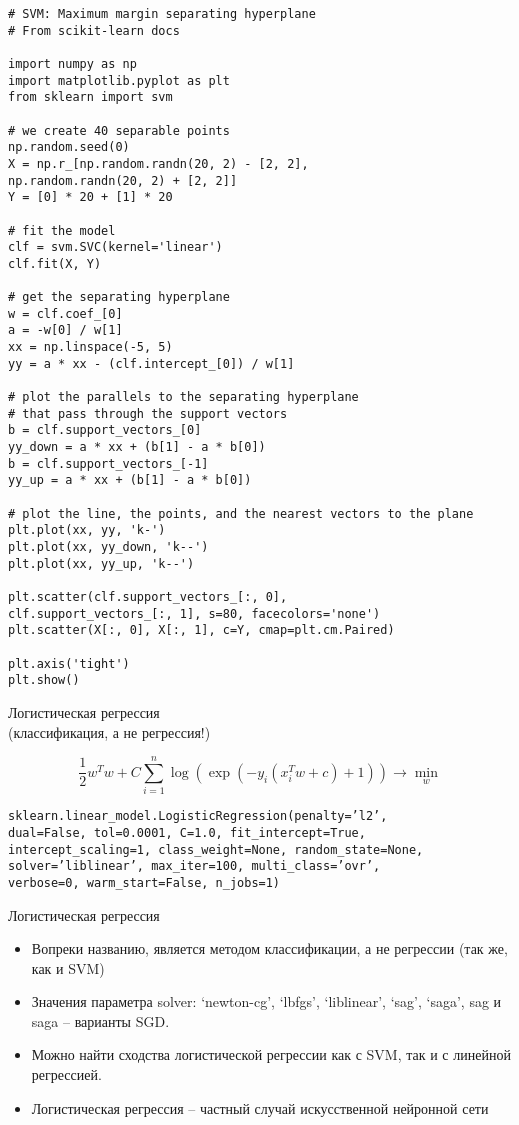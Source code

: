 \documentclass[landscape]{slides}
\begin{document}
\begin{slide}
\begin{verbatim}
# SVM: Maximum margin separating hyperplane
# From scikit-learn docs

import numpy as np
import matplotlib.pyplot as plt
from sklearn import svm

# we create 40 separable points
np.random.seed(0)
X = np.r_[np.random.randn(20, 2) - [2, 2],
np.random.randn(20, 2) + [2, 2]]
Y = [0] * 20 + [1] * 20

# fit the model
clf = svm.SVC(kernel='linear')
clf.fit(X, Y)

# get the separating hyperplane
w = clf.coef_[0]
a = -w[0] / w[1]
xx = np.linspace(-5, 5)
yy = a * xx - (clf.intercept_[0]) / w[1]

# plot the parallels to the separating hyperplane 
# that pass through the support vectors
b = clf.support_vectors_[0]
yy_down = a * xx + (b[1] - a * b[0])
b = clf.support_vectors_[-1]
yy_up = a * xx + (b[1] - a * b[0])

# plot the line, the points, and the nearest vectors to the plane
plt.plot(xx, yy, 'k-')
plt.plot(xx, yy_down, 'k--')
plt.plot(xx, yy_up, 'k--')

plt.scatter(clf.support_vectors_[:, 0],
clf.support_vectors_[:, 1], s=80, facecolors='none')
plt.scatter(X[:, 0], X[:, 1], c=Y, cmap=plt.cm.Paired)

plt.axis('tight')
plt.show()
\end{verbatim}
\end{slide}


\begin{slide}
Логистическая регрессия\\
(классификация, а не регрессия!)

$$ \frac 12 w^Tw + C \sum_{i=1}^n
\log\left(\exp\left(-y_i(x_i^Tw+c)+1\right)\right) \to \min_w$$

\begin{verbatim}
sklearn.linear_model.LogisticRegression(penalty=’l2’,
dual=False, tol=0.0001, C=1.0, fit_intercept=True,
intercept_scaling=1, class_weight=None, random_state=None,
solver=’liblinear’, max_iter=100, multi_class=’ovr’,
verbose=0, warm_start=False, n_jobs=1)
\end{verbatim}
\end{slide}


\begin{slide}
Логистическая регрессия

\begin{itemize}
\item Вопреки названию, является методом классификации, а не регрессии (так же, как и SVM)
\item Значения параметра solver: {‘newton-cg’, ‘lbfgs’, ‘liblinear’, ‘sag’, ‘saga’},
sag и saga -- варианты SGD.
\item Можно найти сходства логистической регрессии как с SVM, так и с линейной регрессией.
\item Логистическая регрессия -- частный случай искусственной нейронной сети
\end{itemize}
\end{slide}
\end{document}
